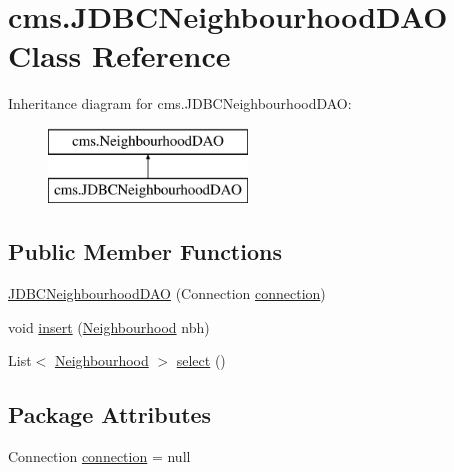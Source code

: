 \hypertarget{classcms_1_1_j_d_b_c_neighbourhood_d_a_o}{}\section{cms.\+J\+D\+B\+C\+Neighbourhood\+D\+AO Class Reference}
\label{classcms_1_1_j_d_b_c_neighbourhood_d_a_o}
Inheritance diagram for cms.\+J\+D\+B\+C\+Neighbourhood\+D\+AO\+:\begin{figure}[H]
\begin{center}
\leavevmode
\includegraphics[height=2.000000cm]{classcms_1_1_j_d_b_c_neighbourhood_d_a_o}
\end{center}
\end{figure}
\subsection*{Public Member Functions}
\begin{DoxyCompactItemize}
\item 
\mbox{\hyperlink{classcms_1_1_j_d_b_c_neighbourhood_d_a_o_a837dc9a2c409a5ae347271788c1d7d82}{J\+D\+B\+C\+Neighbourhood\+D\+AO}} (Connection \mbox{\hyperlink{classcms_1_1_j_d_b_c_neighbourhood_d_a_o_a21abebcd3f93f10746a2c96c70d6dafc}{connection}})
\item 
void \mbox{\hyperlink{classcms_1_1_j_d_b_c_neighbourhood_d_a_o_a5d43b764d1f27721d860dc371ae4b08e}{insert}} (\mbox{\hyperlink{classcms_1_1_neighbourhood}{Neighbourhood}} nbh)
\item 
List$<$ \mbox{\hyperlink{classcms_1_1_neighbourhood}{Neighbourhood}} $>$ \mbox{\hyperlink{classcms_1_1_j_d_b_c_neighbourhood_d_a_o_a31a2e927837aa79108ef13890dd9be75}{select}} ()
\end{DoxyCompactItemize}
\subsection*{Package Attributes}
\begin{DoxyCompactItemize}
\item 
Connection \mbox{\hyperlink{classcms_1_1_j_d_b_c_neighbourhood_d_a_o_a21abebcd3f93f10746a2c96c70d6dafc}{connection}} = null
\end{DoxyCompactItemize}


